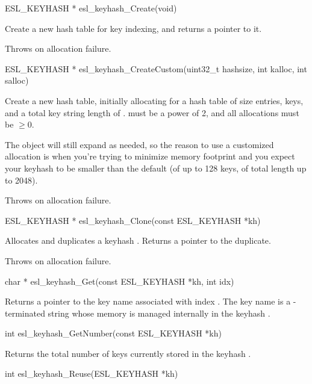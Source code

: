 \begin{sreapi}
\hypertarget{func:esl_keyhash_Create()}
{\item[ESL\_KEYHASH * esl\_keyhash\_Create(void)]}

Create a new hash table for key indexing, and returns
a pointer to it.

Throws  on allocation failure.



\hypertarget{func:esl_keyhash_CreateCustom()}
{\item[ESL\_KEYHASH * esl\_keyhash\_CreateCustom(uint32\_t hashsize, int kalloc, int salloc)]}

Create a new hash table, initially allocating for
a hash table of size  entries,  
keys, and a total key string length of .
 must be a power of 2, and all allocations
must be $\geq 0$. 

The object will still expand as needed, so the reason to
use a customized allocation is when you're trying to
minimize memory footprint and you expect your keyhash to
be smaller than the default (of up to 128 keys, of total
length up to 2048).

Throws  on allocation failure.


\hypertarget{func:esl_keyhash_Clone()}
{\item[ESL\_KEYHASH * esl\_keyhash\_Clone(const ESL\_KEYHASH *kh)]}

Allocates and duplicates a keyhash . Returns a
pointer to the duplicate.

Throws  on allocation failure.


\hypertarget{func:esl_keyhash_Get()}
{\item[char * esl\_keyhash\_Get(const ESL\_KEYHASH *kh, int idx)]}

Returns a pointer to the key name associated
with index . The key name is a -terminated 
string whose memory is managed internally in
the keyhash .


\hypertarget{func:esl_keyhash_GetNumber()}
{\item[int esl\_keyhash\_GetNumber(const ESL\_KEYHASH *kh)]}

Returns the total number of keys currently stored in the
keyhash .


\hypertarget{func:esl_keyhash_Reuse()}
{\item[int esl\_keyhash\_Reuse(ESL\_KEYHASH *kh)]}


\end{sreapi}
